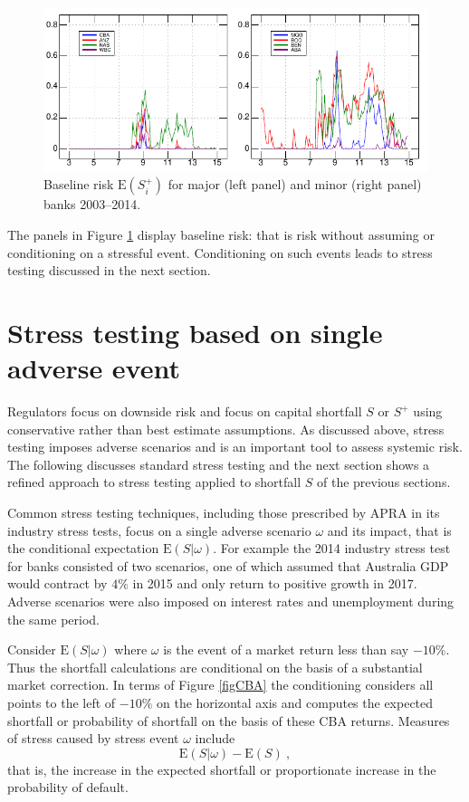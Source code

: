 \documentclass[authoryear]{elsarticle}
\newcommand{\E}{{\mathrm E}}
\newcommand{\fref}[1]{Figure \ref{#1}}
\begin{document}
\begin{figure}[htbp]
\begin{center}
\includegraphics[width=12cm]{figures/defaulttop.pdf}
\caption{Baseline risk $\E(S_i^+)$  for   major (left panel) and  minor (right panel)  banks 2003--2014.}\label{defaulttop}
\end{center}
\end{figure}

The  panels in  \fref{defaulttop} display baseline risk: that is risk without assuming or conditioning on a stressful event.   Conditioning on such events leads to stress testing discussed in the next section.


\section{Stress testing based on single adverse event}\label{s_st}

Regulators focus on downside risk and focus on  capital shortfall $S$ or $S^+$ using conservative rather than best estimate assumptions. As discussed above, stress testing imposes adverse scenarios and is an important tool to assess systemic risk. The following  discusses standard stress testing and the next section shows a refined approach to stress testing applied to  shortfall $S$ of the  previous sections.

Common stress testing techniques, including those prescribed by APRA in its industry stress tests, focus on a single adverse scenario $\omega$ and its impact, that is the conditional expectation $\E(S|\omega)$. For example the 2014 industry stress test for banks consisted of two scenarios, one of which assumed that Australia GDP would contract by $4\%$ in 2015 and only return to positive growth in 2017. Adverse scenarios were also imposed on interest rates and unemployment during the same period.

Consider
$
\E(S| \omega)$ 
where $\omega$ is the event of  a market return less than say $-10\%$.   Thus the shortfall calculations are conditional on the basis of a substantial market correction.   In terms of \fref{figCBA} the conditioning considers all points to the left of $-10\%$ on the horizontal axis and computes the expected shortfall  or probability of shortfall  on the basis of these CBA returns.   
Measures of stress caused by stress event $\omega$   include 
$$
\E(S|\omega)-\E(S)\ ,
$$ 
that is, the  increase in the expected shortfall or proportionate increase in the probability of default. 
\end{document}
